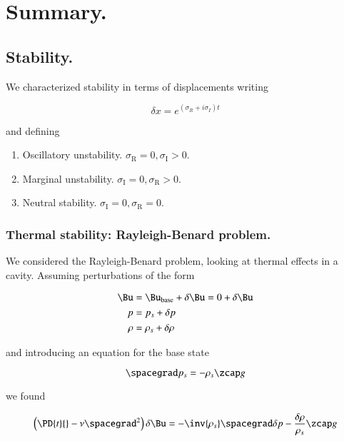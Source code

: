 \section{Summary.}
\subsection{Stability.}

We characterized stability in terms of displacements writing

\begin{equation}\label{eqn:continuumFluidsReview:2770}
\delta x = e^{(\sigma_R + i \sigma_I) t}
\end{equation}

and defining
\begin{enumerate}
\item Oscillatory unstability.  $\sigma_{\text{R}} = 0, \sigma_{\text{I}} > 0$.
\item Marginal unstability.  $\sigma_{\text{I}} = 0, \sigma_{\text{R}} > 0$.
\item Neutral stability.  $\sigma_{\text{I}} = 0, \sigma_{\text{R}} = 0$.
\end{enumerate}

\subsubsection{Thermal stability: Rayleigh-Benard problem.}

We considered the Rayleigh-Benard problem, looking at thermal effects in a cavity.  Assuming perturbations of the form

\begin{align*}
\Bu &= \Bu_\text{base} + \delta \Bu = 0 + \delta \Bu \\
p &= p_s + \delta p \\
\rho &= \rho_s + \delta \rho
\end{align*}

and introducing an equation for the base state

\begin{equation}\label{eqn:continuumFluidsReview:2790}
\spacegrad p_s = -\rho_s \zcap g
\end{equation}

we found

\begin{equation}\label{eqn:continuumFluidsReview:2810}
\left( \PD{t}{} - \nu \spacegrad^2 \right) \delta \Bu = -\inv{\rho_s} \spacegrad \delta p - \frac{\delta \rho}{\rho_s} \zcap g
\end{equation}

